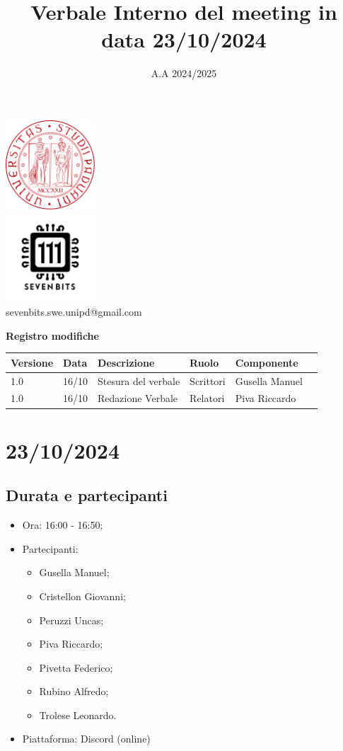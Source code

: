 \documentclass[12pt]{article}
\title{Verbale Interno del meeting in data 23/10/2024}
\date{A.A 2024/2025}
\begin{document}
\maketitle
\center 
\includegraphics[width=0.25\textwidth]{LogoUnipd}\\
\includegraphics[width=0.25\textwidth]{Sevenbitslogo}\\
sevenbits.swe.unipd@gmail.com\\
\vspace{2mm}

\textbf{Registro modifiche}\\
\vspace{2mm}
\begin{tabular}{|l|l|l|l|l|l|}
\hline
\textbf{Versione} & \textbf{Data} & \textbf{Descrizione} & \textbf{Ruolo} & \textbf{Componente} \\
\hline
1.0 & 16/10 & Stesura del verbale & Scrittori & Gusella Manuel\\
\hline
1.0 & 16/10 & Redazione Verbale  & Relatori & Piva Riccardo\\
\hline
\end{tabular}

\raggedright
\tableofcontents
\newpage
\section{23/10/2024}
\subsection{Durata e partecipanti}
\begin{itemize}
\item Ora: 16:00 - 16:50;
\item Partecipanti: 	
	\begin{itemize}
	\item Gusella Manuel;
	\item Cristellon Giovanni;
	\item Peruzzi Uncas;
	\item Piva Riccardo;
	\item Pivetta Federico;
	\item Rubino Alfredo;
	\item Trolese Leonardo.
	\end{itemize}
\item Piattaforma: Discord (online)
\end{itemize}
\end{document}
